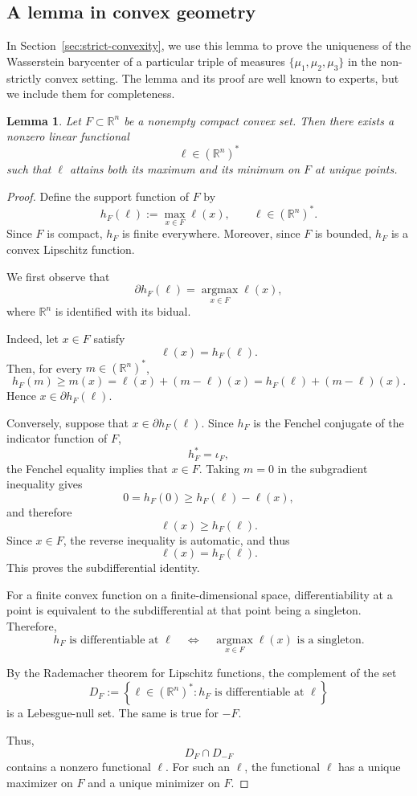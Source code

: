 \documentclass[10pt,a4paper]{amsart}
\numberwithin{equation}{section}
\newtheorem{lemma}[theorem]{Lemma}
\newcommand{\argmax}{\operatorname*{argmax}}
\begin{document}
	\subsection{A lemma in convex geometry}\label{subsec:convex-geometry-lemma}
	In Section~\ref{sec:strict-convexity}, we use this lemma to prove the uniqueness of the Wasserstein barycenter of a particular triple of measures $\{\mu_1,\mu_2,\mu_3\}$ in the non-strictly convex setting. The lemma and its proof are well known to experts, but we include them for completeness.
	\begin{lemma}\label{lem}
		Let \(F \subset \mathbb{R}^n\) be a nonempty compact convex set. Then there exists a nonzero linear functional
		\[
		\ell \in (\mathbb{R}^n)^*
		\]
		such that \(\ell\) attains both its maximum and its minimum on \(F\) at unique points.
	\end{lemma}
	
	\begin{proof}
		Define the support function of \(F\) by
		\[
		h_F(\ell):=\max_{x\in F}\ell(x),
		\qquad
		\ell\in (\mathbb{R}^n)^*.
		\]
		Since \(F\) is compact, \(h_F\) is finite everywhere. Moreover, since \(F\) is bounded, \(h_F\) is a convex Lipschitz function.
		
		We first observe that
		\[
		\partial h_F(\ell)
		=
		\argmax_{x\in F}\ell(x),
		\]
		where \(\mathbb{R}^n\) is identified with its bidual.
		
		Indeed, let \(x\in F\) satisfy
		\[
		\ell(x)=h_F(\ell).
		\]
		Then, for every \(m\in(\mathbb{R}^n)^*\),
		\[
		h_F(m)\geq m(x)
		=
		\ell(x)+(m-\ell)(x)
		=
		h_F(\ell)+(m-\ell)(x).
		\]
		Hence \(x\in\partial h_F(\ell)\).
		
		Conversely, suppose that \(x\in\partial h_F(\ell)\). Since \(h_F\) is the Fenchel conjugate of the indicator function of \(F\),
		\[
		h_F^*=\iota_F,
		\]
		the Fenchel equality implies that \(x\in F\). Taking \(m=0\) in the subgradient inequality gives
		\[
		0=h_F(0)
		\geq
		h_F(\ell)-\ell(x),
		\]
		and therefore
		\[
		\ell(x)\geq h_F(\ell).
		\]
		Since \(x\in F\), the reverse inequality is automatic, and thus
		\[
		\ell(x)=h_F(\ell).
		\]
		This proves the subdifferential identity.
		
		For a finite convex function on a finite-dimensional space, differentiability at a point is equivalent to the subdifferential at that point being a singleton. Therefore,
		\[
		h_F \text{ is differentiable at } \ell
		\quad\Longleftrightarrow\quad
		\argmax_{x\in F}\ell(x)
		\text{ is a singleton}.
		\]
		
		By the Rademacher theorem for Lipschitz functions, the complement of the set
		\[
		D_F
		:=
		\left\{
		\ell\in(\mathbb{R}^n)^*:
		h_F \text{ is differentiable at }\ell
		\right\}
		\]
		is a Lebesgue-null set. The same is true for \(-F\).
		
		Thus,
		\[
		D_F\cap D_{-F}
		\]
		contains a nonzero functional \(\ell\). For such an \(\ell\), the functional \(\ell\) has a unique maximizer on \(F\) and a unique minimizer on \(F\).
	\end{proof}
	
\end{document}
